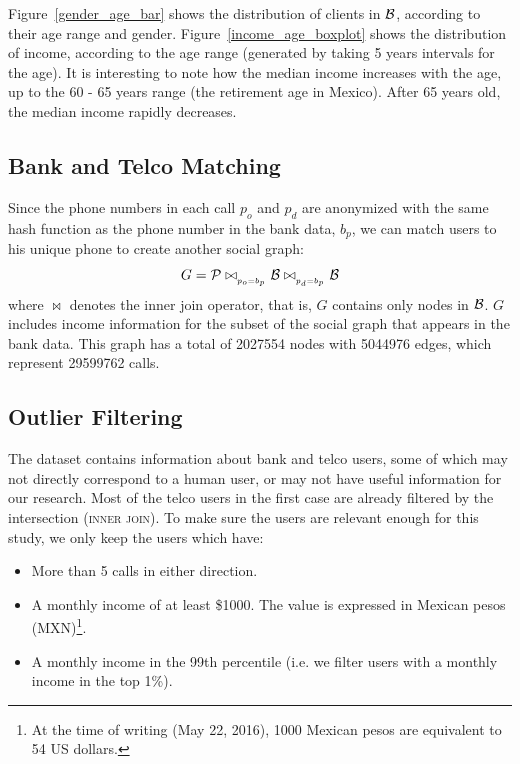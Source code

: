 Figure~\ref{gender_age_bar} shows the distribution of clients in $\mathcal{B}$, according to
their age range and gender.
Figure~\ref{income_age_boxplot} shows the distribution of income, according to the age range (generated by taking 5 years intervals for the age).
It is interesting to note how the median income increases with the age, up to 
the 60 - 65 years range (the retirement age in Mexico). After 65 years old, the median income rapidly decreases.


\subsection{Bank and Telco Matching}

Since the phone numbers in each call $ p_o $ and $ p_d $ are anonymized with the same hash function as the phone number in the bank data, $ b_p $, we can match users to his unique phone to create another social graph: 
$$ G = \mathcal{P} \bowtie_{_{p_o = b_p}} \mathcal{B} \bowtie_{_{p_d = b_p}} \mathcal{B} $$ 
where $\bowtie$ denotes the inner join operator, that is, $G$ contains only nodes in $\mathcal{B}$. $G$ includes income information for the subset of the social graph that appears in the bank data.
This graph has a total of \num{2027554} nodes with \num{5044976} edges, which represent \num{29599762} calls. %

\subsection{Outlier Filtering}

The dataset contains information about bank and telco users, some of which may not directly correspond to a human user, %
or may not have useful information for our research. 
Most of the telco users in the first case are already filtered by the intersection (\textsc{inner join}). To make sure the users are relevant enough for this study, we only keep the users which have:

\begin{itemize}
	\item More than 5 calls in either direction.
	\item A monthly income of at least \$\num{1000}.
	The value is expressed in Mexican pesos (MXN)\footnote{At the time of writing (May 22, 2016), 1000 Mexican pesos are equivalent to 54 US dollars.}.
	\item A monthly income in the \num{99}th percentile
	(i.e. we filter users with a monthly income in the top 1\%).
\end{itemize}
